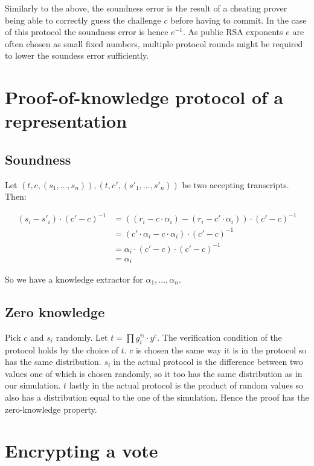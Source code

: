 \documentclass[a4paper]{scrreprt}
\begin{document}
Similarly to the above, the soundness error is the result of a cheating prover
being able to correctly guess the challenge $c$ before having to commit. In the
case of this protocol the soundness error is hence $e^{-1}$. As public RSA
exponents $e$ are often chosen as small fixed numbers, multiple protocol rounds
might be required to lower the soundess error sufficiently.

\section{Proof-of-knowledge protocol of a representation}

\subsection{Soundness}

Let $(t, c, (s_1, \ldots, s_n)), (t, c', (s'_1, \ldots, s'_n))$ be two accepting
transcripts. Then:

\begin{align*}
		(s_i - s'_i) \cdot (c' - c)^{-1} & = ((r_i - c \cdot \alpha_i) - (r_i - c' \cdot \alpha_i)) \cdot (c' - c)^{-1} \\
										 & = (c' \cdot \alpha_i - c \cdot \alpha_i) \cdot (c' - c)^{-1} \\
										 & = \alpha_i \cdot (c' - c) \cdot (c' - c)^{-1} \\
										 & = \alpha_i
\end{align*}

So we have a knowledge extractor for $\alpha_1, \ldots, \alpha_n$.

\subsection{Zero knowledge}

Pick $c$ and $s_i$ randomly. Let $t = \prod g_i^{s_i} \cdot y^c$. The
verification condition of the protocol holds by the choice of $t$. $c$ is
chosen the same way it is in the protocol so has the same distribution. $s_i$
in the actual protocol is the difference between two values one of which is
chosen randomly, so it too has the same distribution as in our simulation. $t$
lastly in the actual protocol is the product of random values so also has a
distribution equal to the one of the simulation. Hence the proof has the
zero-knowledge property.

\section{Encrypting a vote}
\end{document}
